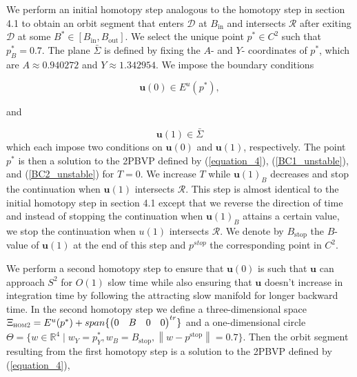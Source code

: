 \documentclass{ws-ijbc}
\begin{document}
We perform an initial homotopy step analogous to the homotopy step in section 4.1 to obtain an orbit segment that enters $\mathscr{D}$ at $B_{\mathrm{in}}$ and intersects $\mathscr{R}$ after exiting $\mathscr{D}$ at some $B^* \in [B_{\mathrm{in}}, B_{\mathrm{out}}]$.  We select the unique point $p^* \in C^2$ such that $p^*_B=0.7$.  The plane $\bar{\Sigma}$ is defined by fixing the $A$- and $Y$- coordinates of $p^*$, which are $A \approx 0.940272$ and $Y \approx 1.342954$.  We impose the boundary conditions

\begin{equation}
\mathbf{u}(0) \in E^u(p^*),
\label{BC1_unstable}
\end{equation}

\noindent
and 

\begin{equation}
\mathbf{u}(1) \in \bar{\Sigma}
\label{BC2_unstable}
\end{equation}
\noindent
which each impose two conditions on $\mathbf{u}(0)$ and $\mathbf{u}(1)$, respectively.  The point $p^*$ is then a solution to the 2PBVP defined by (\ref{equation_4}), (\ref{BC1_unstable}), and (\ref{BC2_unstable}) for $T=0$.  We increase $T$ while $\mathbf{u}(1)_B$ decreases and stop the continuation when $\mathbf{u}(1)$ intersects $\mathscr{R}$.  This step is almost identical to the initial homotopy step in section 4.1 except that we reverse the direction of time and instead of stopping the continuation when $\mathbf{u}(1)_B$ attains a certain value, we stop the continuation when $u(1)$ intersects $\mathscr{R}$.  We denote by $B_{\mathrm{stop}}$ the $B$-value of $\mathbf{u}(1)$ at the end of this step and $p^{stop}$ the corresponding point in $C^2$.

We perform a second homotopy step to ensure that $\mathbf{u}(0)$ is such that $\mathbf{u}$ can approach $S^2$ for $O(1)$ slow time while also ensuring that $\mathbf{u}$ doesn't increase in integration time by following the attracting slow manifold for longer backward time.  In the second homotopy step we define a three-dimensional space $\Xi_{\textsc{hom2}} = E^u(p^*) + span\{ \begin{pmatrix} 0 & B & 0 & 0 \end{pmatrix}^{tr} \}$ and a one-dimensional circle $\Theta = \{ w \in \mathbb{R}^4 \; | \; w_Y=p^*_Y, w_B=B_{\mathrm{stop}}, \left\lVert w-p^{\mathrm{stop}} \right\lVert=0.7\}$.  Then the orbit segment resulting from the first homotopy step is a solution to the 2PBVP defined by (\ref{equation_4}),
\end{document}
